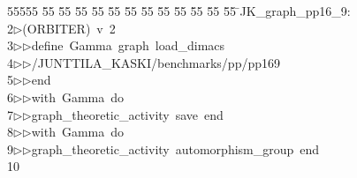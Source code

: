 %
%
\begin{tabbing}
55555 \= 55 \= 55 \= 55 \= 55 \= 55 \= 55 \= 55 \= 55 \= 55 \= 55 \= 55 \= 55 \= \>JK\_graph\_pp16\_9:\\[0pt]
2\>$\triangleright$\>(ORBITER)\ v\ 2\ \\[0pt]
3\>$\triangleright$\>$\triangleright$\>define\ Gamma\ graph\ load\_dimacs\ \\[0pt]
4\>$\triangleright$\>$\triangleright$\>/JUNTTILA\_KASKI/benchmarks/pp/pp169\ \\[0pt]
5\>$\triangleright$\>$\triangleright$\>end\ \\[0pt]
6\>$\triangleright$\>$\triangleright$\>with\ Gamma\ do\ \\[0pt]
7\>$\triangleright$\>$\triangleright$\>graph\_theoretic\_activity\ save\ end\ \\[0pt]
8\>$\triangleright$\>$\triangleright$\>with\ Gamma\ do\ \\[0pt]
9\>$\triangleright$\>$\triangleright$\>graph\_theoretic\_activity\ automorphism\_group\ end\ \\[0pt]
10\>\end{tabbing}
